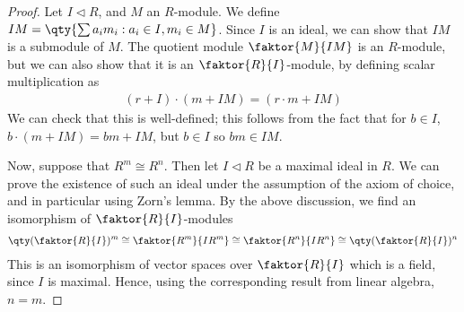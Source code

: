\begin{proof}
	Let $I \triangleleft R$, and $M$ an $R$-module.
	We define $IM = \qty{\sum a_i m_i : a_i \in I, m_i \in M}$.
	Since $I$ is an ideal, we can show that $IM$ is a submodule of $M$.
	The quotient module $\faktor{M}{IM}$ is an $R$-module, but we can also show that it is an $\faktor{R}{I}$-module, by defining scalar multiplication as
	\begin{align*}
		(r+I) \cdot (m+IM) = (r \cdot m + IM)
	\end{align*}
	We can check that this is well-defined; this follows from the fact that for $b \in I$, $b \cdot (m + IM) = bm + IM$, but $b \in I$ so $bm \in IM$.

	Now, suppose that $R^m \cong R^n$.
	Then let $I \triangleleft R$ be a maximal ideal in $R$.
	We can prove the existence of such an ideal under the assumption of the axiom of choice, and in particular using Zorn's lemma.
	By the above discussion, we find an isomorphism of $\faktor{R}{I}$-modules
	\begin{align*}
		\qty(\faktor{R}{I})^m \cong \faktor{R^m}{IR^m} \cong \faktor{R^n}{IR^n} \cong \qty(\faktor{R}{I})^n
	\end{align*}
	This is an isomorphism of vector spaces over $\faktor{R}{I}$ which is a field, since $I$ is maximal.
	Hence, using the corresponding result from linear algebra, $n = m$.
\end{proof}

